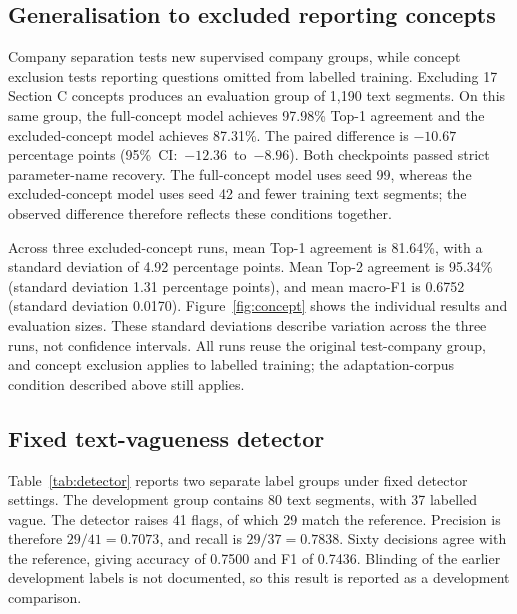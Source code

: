 

\subsection{Generalisation to excluded reporting concepts}
\label{sec:concept_diagnostics}

Company separation tests new supervised company groups, while concept exclusion tests reporting questions omitted from labelled training. Excluding 17 Section C concepts produces an evaluation group of 1,190 text segments. On this same group, the full-concept model achieves 97.98\% Top-1 agreement and the excluded-concept model achieves 87.31\%. The paired difference is $-10.67$ percentage points \mbox{(95\% CI: $-12.36$ to $-8.96$)}. Both checkpoints passed strict parameter-name recovery. The full-concept model uses seed 99, whereas the excluded-concept model uses seed 42 and fewer training text segments; the observed difference therefore reflects these conditions together.

Across three excluded-concept runs, mean Top-1 agreement is 81.64\%, with a standard deviation of 4.92 percentage points. Mean Top-2 agreement is 95.34\% (standard deviation 1.31 percentage points), and mean macro-F1 is 0.6752 (standard deviation 0.0170). Figure~\ref{fig:concept} shows the individual results and evaluation sizes. These standard deviations describe variation across the three runs, not confidence intervals. All runs reuse the original test-company group, and concept exclusion applies to labelled training; the adaptation-corpus condition described above still applies.



\subsection{Fixed text-vagueness detector}

Table~\ref{tab:detector} reports two separate label groups under fixed detector settings. The development group contains 80 text segments, with 37 labelled vague. The detector raises 41 flags, of which 29 match the reference. Precision is therefore $29/41=0.7073$, and recall is $29/37=0.7838$. Sixty decisions agree with the reference, giving accuracy of 0.7500 and F1 of 0.7436. Blinding of the earlier development labels is not documented, so this result is reported as a development comparison.

